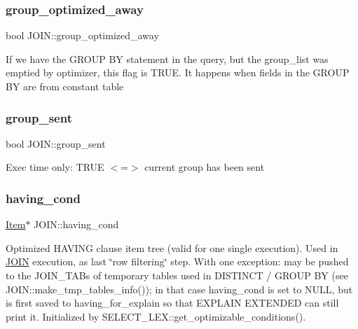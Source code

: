 \subsubsection{\texorpdfstring{group\+\_\+optimized\+\_\+away}{group\_optimized\_away}}
{\footnotesize\ttfamily bool J\+O\+I\+N\+::group\+\_\+optimized\+\_\+away}

If we have the G\+R\+O\+UP BY statement in the query, but the group\+\_\+list was emptied by optimizer, this flag is T\+R\+UE. It happens when fields in the G\+R\+O\+UP BY are from constant table \mbox{\label{classJOIN_a988da063141c9923352565697bdf3c78}} 
\subsubsection{\texorpdfstring{group\+\_\+sent}{group\_sent}}
{\footnotesize\ttfamily bool J\+O\+I\+N\+::group\+\_\+sent}

Exec time only\+: T\+R\+UE $<$=$>$ current group has been sent \mbox{\label{classJOIN_a69dc26a844c4680287a0a5281881073a}} 
\subsubsection{\texorpdfstring{having\+\_\+cond}{having\_cond}}
{\footnotesize\ttfamily \mbox{\hyperlink{classItem}{Item}}$\ast$ J\+O\+I\+N\+::having\+\_\+cond}

Optimized H\+A\+V\+I\+NG clause item tree (valid for one single execution). Used in \mbox{\hyperlink{classJOIN}{J\+O\+IN}} execution, as last \char`\"{}row filtering\char`\"{} step. With one exception\+: may be pushed to the J\+O\+I\+N\+\_\+\+T\+A\+Bs of temporary tables used in D\+I\+S\+T\+I\+N\+CT / G\+R\+O\+UP BY (see J\+O\+I\+N\+::make\+\_\+tmp\+\_\+tables\+\_\+info()); in that case having\+\_\+cond is set to N\+U\+LL, but is first saved to having\+\_\+for\+\_\+explain so that E\+X\+P\+L\+A\+IN E\+X\+T\+E\+N\+D\+ED can still print it. Initialized by S\+E\+L\+E\+C\+T\+\_\+\+L\+E\+X\+::get\+\_\+optimizable\+\_\+conditions(). \mbox{\label{classJOIN_a0f4a3bf606f174303181a5c7d730bdbb}} 
